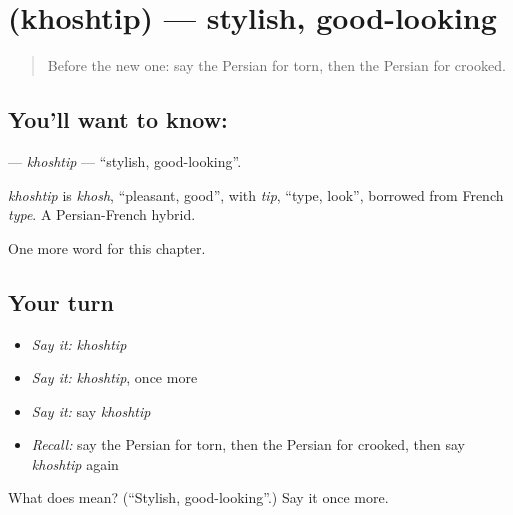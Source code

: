 \section[\texorpdfstring{\fa{خوشتیپ} (khoshtip)}{خوشتیپ (khoshtip)}]{ (khoshtip) — stylish, good-looking}

\label{lesson:FA-C202-khoshtip}



\begin{quote}
Before the new one: say the Persian for torn, then the Persian for crooked.
\end{quote}

\subsection*{You'll want to know: }
\textbf{} — \emph{khoshtip} — \textquotedblleft{}stylish, good-looking\textquotedblright{}.

\begin{cousinweb}
\emph{khoshtip} is \emph{khosh}, \textquotedblleft{}pleasant, good\textquotedblright{}, with \emph{tip}, \textquotedblleft{}type, look\textquotedblright{}, borrowed from French \emph{type}. A Persian-French hybrid.
\end{cousinweb}

\begin{grammarlens}[title={What you've built}]
One more word for this chapter.
\end{grammarlens}

\subsection*{Your turn}
\begin{itemize}
\raggedright
  \item \emph{Say it:} \emph{khoshtip}
  \item \emph{Say it:} \emph{khoshtip}, once more
  \item \emph{Say it:} say \emph{khoshtip}
  \item \emph{Recall:} say the Persian for torn, then the Persian for crooked, then say \emph{khoshtip} again
\end{itemize}

\begin{tcolorbox}[breakable,colback=teal!4,colframe=teal!35!black,title={Before you move on}]
What does  mean? (\textquotedblleft{}Stylish, good-looking\textquotedblright{}.) Say it once more.
\end{tcolorbox}

